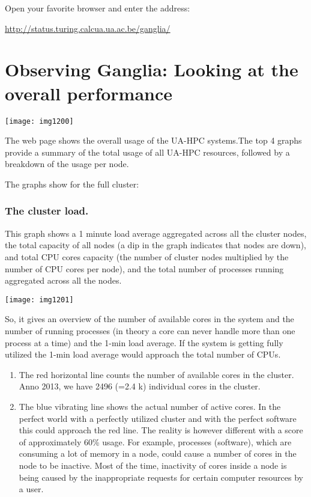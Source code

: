 Open your favorite browser and enter the address:

\url{http://status.turing.calcua.ua.ac.be/ganglia/}

\section{Observing Ganglia: Looking at the overall performance}

\texttt{[image: img1200]}

The web page shows the overall usage of the UA-HPC systems.The top 4 graphs
provide a summary of the total usage of all UA-HPC resources, followed by a
breakdown of the usage per node.

The graphs show for the full cluster:

\subsubsection{The cluster load.}

This graph shows a 1 minute load average aggregated across all the cluster
nodes, the total capacity of all nodes (a dip in the graph indicates that nodes
are down), and total CPU cores capacity (the number of cluster nodes multiplied
by the number of CPU cores per node), and the total number of processes running
aggregated across all the nodes.

\texttt{[image: img1201]}

So, it gives an overview of the number of available cores in the system and the
number of running processes (in theory a core can never handle more than one
process at a time) and the 1-min load average. If the system is getting fully
utilized the 1-min load average would approach the total number of CPUs.

\begin{enumerate}
\item  The red horizontal line counts the number of available cores in the cluster. Anno 2013, we have 2496 (=2.4 k) individual cores in the cluster.
\item  The blue vibrating line shows the actual number of active cores. In the perfect world with a perfectly utilized cluster and with the perfect software this could approach the red line. The reality is however different with a score of approximately 60\% usage. For example, processes (software), which are consuming a lot of memory in a node, could cause a number of cores in the node to be inactive.  Most of the time, inactivity of cores inside a node is being caused by the inappropriate requests for certain computer resources by a user.
\end{enumerate}

